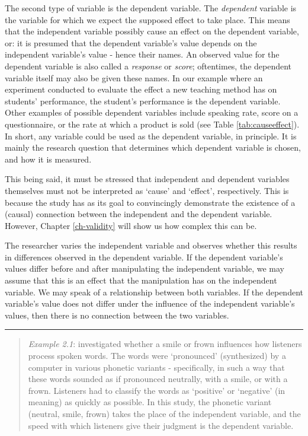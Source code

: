 \documentclass[
]{book}
\begin{document}
The second type of variable is the dependent variable. The \emph{dependent} variable is the variable for which we expect the supposed effect to take place. This means that the independent variable possibly cause an effect on the dependent variable, or: it is presumed that the dependent variable's value depends on the independent variable's value - hence their names. An observed value for the dependent variable is also called a \emph{response} or \emph{score}; oftentimes, the dependent variable itself may also be given these names. In our example where an experiment conducted to evaluate the effect a new teaching method has on students' performance, the student's performance is the dependent variable. Other examples of possible dependent variables include speaking rate, score on a questionnaire, or the rate at which a product is sold (see Table \ref{tab:causeeffect}). In short, any variable could be used as the dependent variable, in principle. It is mainly the research question that determines which dependent variable is chosen, and how it is measured.

This being said, it must be stressed that independent and dependent variables themselves must not be interpreted as `cause' and `effect', respectively. This is because the study has as its goal to convincingly demonstrate the existence of a (causal) connection between the independent and the dependent variable. However, Chapter \ref{ch-validity} will show us how complex this can be.

The researcher varies the independent variable and observes whether this results in differences observed in the dependent variable. If the dependent variable's values differ before and after manipulating the independent variable, we may assume that this is an effect that the manipulation has on the independent variable. We may speak of a relationship between both variables. If the dependent variable's value does not differ under the influence of the independent variable's values, then there is no connection between the two variables.

\begin{center}\rule{0.5\linewidth}{0.5pt}\end{center}

\begin{quote}
\emph{Example 2.1}:
\citet{QSF12} investigated whether a smile or frown influences how listeners process spoken words. The words were `pronounced' (synthesized) by a computer in various phonetic variants - specifically, in such a way that these words sounded as if pronounced neutrally, with a smile, or with a frown. Listeners had to classify the words as `positive' or `negative' (in meaning) as quickly as possible. In this study, the phonetic variant (neutral, smile, frown) takes the place of the independent variable, and the speed with which listeners give their judgment is the dependent variable.
\end{quote}
\end{document}
